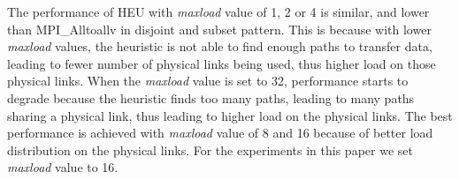 The performance of HEU with \textit{maxload} value of 1, 2 or 4 is similar, and lower than MPI\_Alltoallv in disjoint and subset pattern. This is because with lower \textit{maxload} values, the heuristic is not able to find enough paths to transfer data, leading to fewer number of physical links being used, thus higher load on those physical links. When the \textit{maxload} value is set to 32, performance starts to degrade because 
the heuristic finds too many paths, leading to many paths sharing a physical link, thus leading to higher load on the physical links. The best performance is achieved with \textit{maxload} value of 8 and 16 because of better load distribution on the physical links. For the experiments in this paper we set \textit{maxload} value to 16.
\begin{comment}
When we increase the \textit{maxload} value, it also takes more time to select paths from the $k$ shortest paths. Table \ref{table:solvetime} shows the time for different \textit{maxload} values in different patterns.
\begin{table}[!htbp]
   \centering
   \begin{tabular}{| p {0.75cm}| r | r | r | r | r | r |}
    \hline
    \multirow{2}{*}{Pattern} & \multicolumn{6}{ c| }{Time for Different Max Load (s)} \\ \cline{2-7}
    & 1 & 2 & 4 & 8 & 16 & 32 \\ \hline
    Disjoint & 1.958 & 1.961 & 1.917 & 1.956 & 2.002 &  2.164 \\ \hline
    Overlap & 1.923 & 1.890 & 1.801 & 1.929 & 1.993 & 2.082 \\ \hline
    Subset & 1.907 & 1.870 & 1.891 & 1.955 & 2.024 &  2.223 \\ \hline
    \end{tabular}
    \caption{\small Search time with different max load in 1024 nodes partition.}
    \label{table:solvetime}
\end{table}

The search time is short and thus can be amortized over time when a pattern is used repeatedly.
\end{comment}
